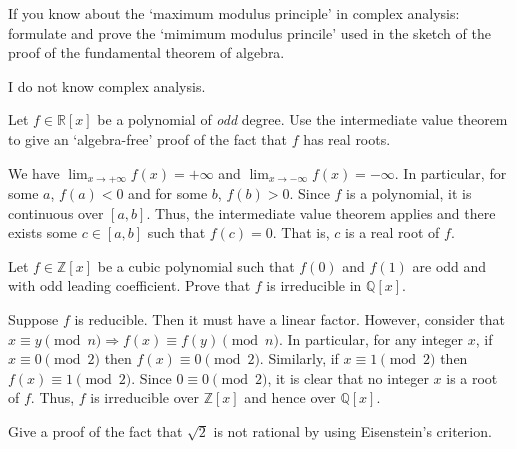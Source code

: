 \documentclass[../../master.tex]{subfiles}
\begin{document}
\begin{problem}
    If you know about the `maximum modulus principle' in complex analysis:
    formulate and prove the `mimimum modulus princile' used in the sketch of the proof of the fundamental theorem of algebra.
\end{problem}

\begin{solution}
    I do not know complex analysis.
\end{solution}

\begin{problem}
    Let $f \in \mathbb{R}[x]$ be a polynomial of \textit{odd} degree.
    Use the intermediate value theorem to give an `algebra-free' proof of the fact that $f$ has real roots.
\end{problem}

\begin{solution}
    We have $\lim_{x \to +\infty} f(x)  = +\infty$ and $\lim_{x \to -\infty} f(x) = -\infty$.
    In particular, for some $a$, $f(a) < 0$ and for some $b$, $f(b) > 0$.
    Since $f$ is a polynomial, it is continuous over $[a, b]$. 
    Thus, the intermediate value theorem applies and there exists some $c \in [a, b]$ such that $f(c) = 0$.
    That is, $c$ is a real root of $f$.
\end{solution}

\begin{problem}
    Let $f \in \mathbb{Z}[x]$ be a cubic polynomial such that $f(0)$ and $f(1)$ are odd and with odd leading coefficient.
    Prove that $f$ is irreducible in $\mathbb{Q}[x]$.
\end{problem}

\begin{solution}
    Suppose $f$ is reducible. Then it must have a linear factor. 
    However, consider that $x \equiv y \pmod n \Longrightarrow f(x) \equiv f(y) \pmod n$.
    In particular, for any integer $x$, if $x \equiv 0 \pmod 2$ then $f(x) \equiv 0 \pmod 2$.
    Similarly, if $x \equiv 1 \pmod 2$ then $f(x) \equiv 1 \pmod 2$.
    Since $0 \equiv 0 \pmod 2$, it is clear that no integer $x$ is a root of $f$.
    Thus, $f$ is irreducible over $\mathbb{Z}[x]$ and hence over $\mathbb{Q}[x]$.
\end{solution}

\begin{problem}
    Give a proof of the fact that $\sqrt{2}$ is not rational by using Eisenstein's criterion.
\end{problem}
\end{document}
